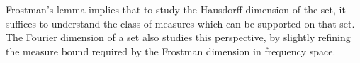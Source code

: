 Frostman's lemma implies that to study the Hausdorff dimension of the set, it suffices to understand the class of measures which can be supported on that set. The Fourier dimension of a set also studies this perspective, by slightly refining the measure bound required by the Frostman dimension in frequency space.











\begin{comment}

\section{Fourier Dimension}

The applicability of Fourier analysis to the analysis of dimension begins by converting the measure bound required on the Frostman dimension onto a condition on the Fourier transform of the measure. For a Borel measure $\mu$, we define the \emph{$s$ energy} of $\mu$ as
%
\[ I_s(\mu) = \int \int \frac{d\mu(x) d\mu(y)}{|x - y|^s}. \]
%
A simple rearrangement shows that for each $y$,
%
\[ \int \int \frac{d\mu(x) d\mu(y)}{|x - y|^s} = s \int_0^\infty \frac{\mu(B(x,r))}{r^{s+1}}\; dr, \]
%
where $B(x,r)$ is the open ball of radius $r$ about the point $x$. This enables us to relate the Frostman bound with energy integrals.

\begin{theorem}
	For any set $E$,
	\[ \hausdim(E) = \sup \{ s : \text{there is $\mu$ supported on $E$ with $I_s(\mu) < \infty$} \}. \]
\end{theorem}
\begin{proof}
	For each $x \in \RR^d$ and $r > 0$, let $B(x,r)$ denote the open ball of radius $r$ centered at $x$. We note $\mu$ is an $s$ dimensional Frostman measure if and only if $\mu(B(x,r)) \lesssim r^s$, since every dyadic cube with sidelength $r$ is contained in $O_d(1)$ balls of radius $r$, and every ball of radius $r$ is contained in $O_d(1)$ dyadic cubes with sidelength $r$. Thus if $\mu$ is a Frostman measure with dimension less than $s$, then $I_s(\mu) < \infty$. Conversely, if $I_s(\mu) < \infty$, then for $\mu$ almost every $y$,
	\[ \int \frac{d\mu(x)}{|x - y|^s} < \infty \]
	In particular, there is $M < \infty$, and $E_0$ with $\mu(E_0) > 0$ such that for any $y \in E_0$,
	\[ \int \frac{d\mu(x)}{|x - y|^s} \leq M. \]
	If we let $\nu(E) = \mu(E \cap E_0)$, then for any $y \in \RR^d$, if $\nu(B(y,r)) > 0$, there is $y_0 \in E \cap B(y,r)$, so $B(y,r) \subset B(y_0,2r)$, and this implies
	\[ \nu(B(y,r)) \leq \nu(B(y_0,2r)) \leq \int_{B(y_0,2r)} d\nu(x) \leq 2^s r^s \int_{B(y_0,2r)} \frac{d\nu(x)}{|x - y|^s} \leq (2^s M) r^s. \]
	Thus $\nu$ is a Frostman measure of dimension $s$ supported on $E$.
\end{proof}


\end{comment}
